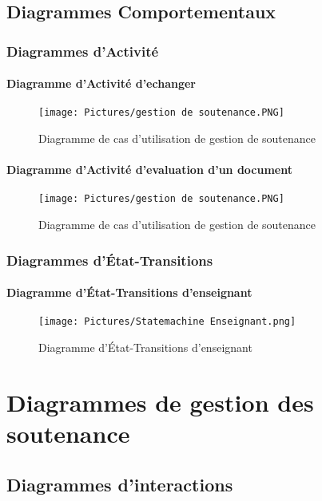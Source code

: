 \documentclass[11pt,fleqn]{book} %
\begin{document}
\section{Diagrammes Comportementaux}
\subsection{Diagrammes d’Activité}
\subsubsection{Diagramme d’Activité d'echanger }
\begin{figure}[h]
    \centering
    \texttt{[image: Pictures/gestion de soutenance.PNG]}
    \caption{Diagramme de cas d'utilisation de gestion de soutenance}
    \label{fig:pca}
\end{figure}
\newpage
\subsubsection{Diagramme d’Activité d'evaluation d'un document}
\begin{figure}[h]
    \centering
    \texttt{[image: Pictures/gestion de soutenance.PNG]}
    \caption{Diagramme de cas d'utilisation de gestion de soutenance}
    \label{fig:pca}
\end{figure}
\newpage
\subsection{Diagrammes d’État-Transitions}
\subsubsection{Diagramme d’État-Transitions d'enseignant}
\begin{figure}[h]
    \centering
    \texttt{[image: Pictures/Statemachine Enseignant.png]}
    \caption{Diagramme d’État-Transitions d'enseignant}
    \label{fig:pca}
\end{figure}
\chapter{Diagrammes de gestion des soutenance}
\section{Diagrammes d'interactions}
\end{document}
